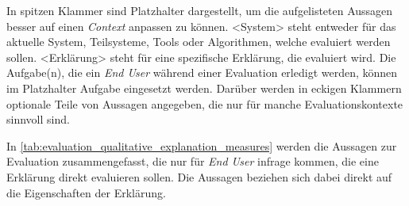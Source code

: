 In spitzen Klammer sind Platzhalter dargestellt, um die aufgelisteten Aussagen besser auf einen \textit{Context} anpassen zu können. \glqq <System>\grqq{} steht entweder für das aktuelle System, Teilsysteme, Tools oder Algorithmen, welche evaluiert werden sollen. \glqq <Erklärung>\grqq{} steht für eine spezifische Erklärung, die evaluiert wird. Die Aufgabe(n), die ein \textit{End User} während einer Evaluation erledigt werden, können im Platzhalter \glqq Aufgabe\grqq{} eingesetzt werden. Darüber werden in eckigen Klammern optionale Teile von Aussagen angegeben, die nur für manche Evaluationskontexte sinnvoll sind.

In \autoref{tab:evaluation_qualitative_explanation_measures} werden die Aussagen zur Evaluation zusammengefasst, die nur für \textit{End User} infrage kommen, die eine Erklärung direkt evaluieren sollen. Die Aussagen beziehen sich dabei direkt auf die Eigenschaften der Erklärung.

